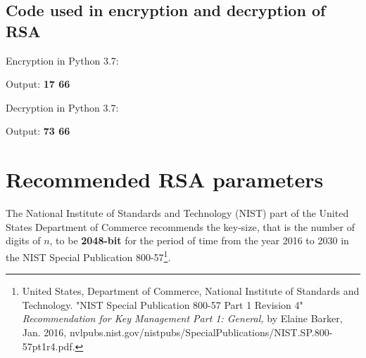 \documentclass[a4paper,12pt]{article}
\theoremstyle{definition}
\begin{document}
\cleardoublepage
\appendix
\begin{singlespace*}
\section{Code used in encryption and decryption of RSA}



\lstset{escapechar=@,style=customc}

Encryption in Python 3.7:

Output: \textbf{17 66}

Decryption in Python 3.7:

Output: \textbf{73 66}
\end{singlespace*}


\newpage
\section{Recommended RSA parameters}
The National Institute of Standards and Technology (NIST) part of the United States Department of Commerce recommends the key-size, that is the number of digits of $n$, to be \textbf{2048-bit} for the period of time from the year 2016 to 2030 in the NIST Special Publication 800-57\footnote{United States, Department of Commerce, National Institute of Standards and Technology. "NIST Special Publication 800-57 Part 1 Revision 4" \textit{Recommendation for Key Management Part 1: General,} by Elaine Barker, Jan. 2016, nvlpubs.nist.gov/nistpubs/SpecialPublications/NIST.SP.800-57pt1r4.pdf.}.


\newpage
\end{document}
